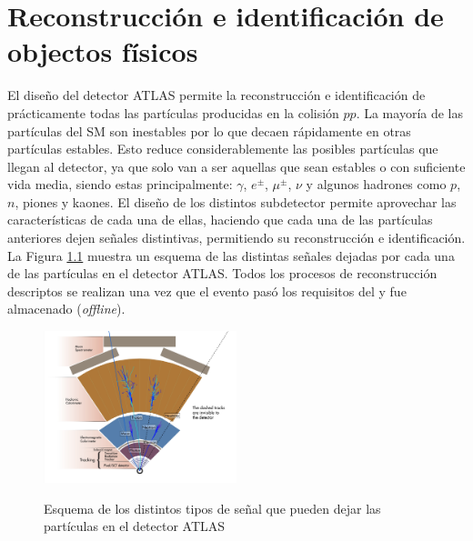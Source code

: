\chapter{Reconstrucción e identificación de objectos físicos} %



El diseño del detector ATLAS permite la reconstrucción e identificación de prácticamente todas las
partículas producidas en la colisión $pp$. 
La mayoría de las partículas del SM son inestables por lo que decaen rápidamente en otras partículas estables. Esto reduce considerablemente las posibles partículas que llegan
al detector, ya que solo van a ser aquellas que sean estables o con suficiente vida media, siendo estas principalmente: $\gamma$, $e^{\pm}$, $\mu^{\pm}$, $\nu$ y algunos hadrones
como $p$, $n$, piones y kaones. El diseño de los distintos subdetector permite aprovechar las
características de cada una de ellas, haciendo que cada una de las partículas anteriores dejen señales distintivas, permitiendo su reconstrucción e identificación. La Figura \ref{particulasATLAS} muestra un esquema de las distintas señales dejadas por cada una de las partículas en el detector ATLAS. Todos los procesos de reconstrucción descriptos se realizan una vez que el evento pasó los requisitos del \trigger y fue almacenado
(\textit{offline}).

\begin{figure}
\centering
\caption{Esquema de los distintos tipos de señal que pueden dejar las partículas en el detector ATLAS }
  \includegraphics[width=0.5\textwidth]{images/cross_section_2-eps-converted-to.pdf}
\label{particulasATLAS}
\end{figure}

